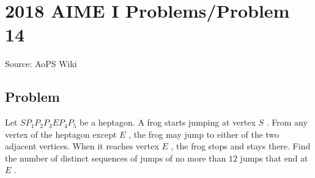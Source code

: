 \documentclass[12pt]{article}
\begin{document}
\section*{{2018 AIME I Problems/Problem 14}}
Source: AoPS Wiki

\subsection*{Problem}
Let $SP_1P_2P_3EP_4P_5$ be a heptagon. A frog starts jumping at vertex $S$ . From any vertex of the heptagon except $E$ , the frog may jump to either of the two adjacent vertices. When it reaches vertex $E$ , the frog stops and stays there. Find the number of distinct sequences of jumps of no more than $12$ jumps that end at $E$ .
\end{document}
